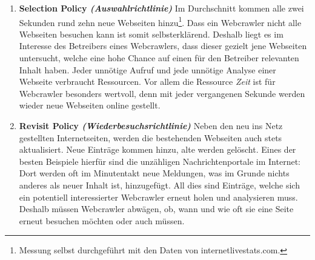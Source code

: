 \begin{enumerate}
	\item \textbf{Selection Policy \emph{(Auswahlrichtlinie)}}\newline
	Im Durchschnitt kommen alle zwei Sekunden rund zehn neue Webseiten hinzu\footnote{Messung selbst durchgeführt mit den Daten von internetlivestats.com\cite{zaehler-webseiten}.}. Dass ein Webcrawler nicht alle Webseiten besuchen kann ist somit selbsterklärend. Deshalb liegt es im Interesse des Betreibers eines Webcrawlers, dass dieser gezielt jene Webseiten untersucht, welche eine hohe Chance auf einen für den Betreiber relevanten Inhalt haben. Jeder unnötige Aufruf und jede unnötige Analyse einer Webseite verbraucht Ressourcen. Vor allem die Ressource \emph{Zeit} ist für Webcrawler  besonders wertvoll, denn mit jeder vergangenen Sekunde werden wieder neue Webseiten online gestellt. 
	
	\item \textbf{Revisit Policy \emph{(Wiederbesuchsrichtlinie)}}\newline
	Neben den neu ins Netz gestellten Internetseiten, werden die bestehenden Webseiten auch stets aktualisiert. Neue Einträge kommen hinzu, alte werden gelöscht. Eines der besten Beispiele hierfür sind die unzähligen Nachrichtenportale im Internet: Dort werden oft im Minutentakt neue Meldungen, was im Grunde nichts anderes als neuer Inhalt ist, hinzugefügt. All dies sind Einträge, welche sich ein potentiell interessierter Webcrawler erneut holen und analysieren muss. Deshalb müssen Webcrawler abwägen, ob, wann und wie oft sie eine Seite erneut besuchen möchten oder auch müssen.
	

\end{enumerate}
